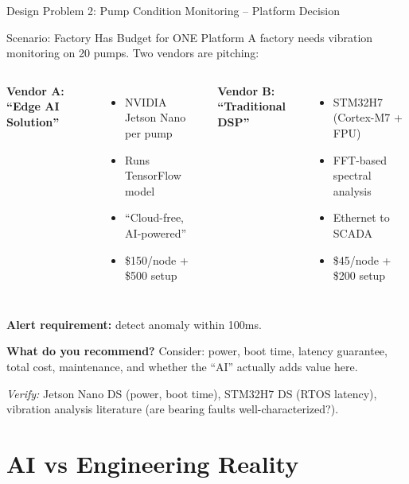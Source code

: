 \documentclass[aspectratio=169,11pt]{beamer}
\begin{document}
\begin{frame}{Design Problem 2: Pump Condition Monitoring -- Platform Decision}
    \begin{block}{Scenario: Factory Has Budget for ONE Platform}
        A factory needs vibration monitoring on 20 pumps. Two vendors are pitching:
        
        \vspace{0.2cm}
        \begin{columns}
            \textbf{Vendor A: ``Edge AI Solution''}
            \begin{itemize}
                \item NVIDIA Jetson Nano per pump
                \item Runs TensorFlow model
                \item ``Cloud-free, AI-powered''
                \item \$150/node + \$500 setup
            \end{itemize}
            
            \textbf{Vendor B: ``Traditional DSP''}
            \begin{itemize}
                \item STM32H7 (Cortex-M7 + FPU)
                \item FFT-based spectral analysis
                \item Ethernet to SCADA
                \item \$45/node + \$200 setup
            \end{itemize}
        \end{columns}
        
        \vspace{0.2cm}
        \textbf{Alert requirement:} detect anomaly within 100ms.
    \end{block}
    
    \textbf{What do you recommend?} Consider: power, boot time, latency guarantee, total cost, maintenance, and whether the ``AI'' actually adds value here.
    
    {\footnotesize \textit{Verify:} Jetson Nano DS (power, boot time), STM32H7 DS (RTOS latency), vibration analysis literature (are bearing faults well-characterized?).}
\end{frame}

\section{AI vs Engineering Reality}
\end{document}
